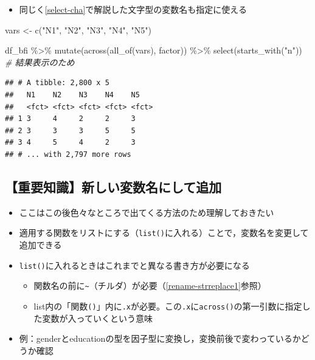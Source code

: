 \documentclass[
  xelatex,ja=standard, b5paper]{bxjsbook}
\newenvironment{Shaded}{\begin{snugshade}}{\end{snugshade}}
\newcommand{\CommentTok}[1]{\textcolor[rgb]{0.56,0.35,0.01}{\textit{#1}}}
\newcommand{\FunctionTok}[1]{\textcolor[rgb]{0.00,0.00,0.00}{#1}}
\newcommand{\NormalTok}[1]{#1}
\newcommand{\OtherTok}[1]{\textcolor[rgb]{0.56,0.35,0.01}{#1}}
\newcommand{\SpecialCharTok}[1]{\textcolor[rgb]{0.00,0.00,0.00}{#1}}
\newcommand{\StringTok}[1]{\textcolor[rgb]{0.31,0.60,0.02}{#1}}
\providecommand{\tightlist}{%
  \setlength{\itemsep}{0pt}\setlength{\parskip}{0pt}}
\begin{document}
\begin{itemize}
\tightlist
\item
  同じく\ref{select-cha}で解説した文字型の変数名も指定に使える
\end{itemize}

\begin{Shaded}
\begin{Highlighting}[]
\NormalTok{vars }\OtherTok{\textless{}{-}} \FunctionTok{c}\NormalTok{(}\StringTok{"N1"}\NormalTok{, }\StringTok{"N2"}\NormalTok{, }\StringTok{"N3"}\NormalTok{, }\StringTok{"N4"}\NormalTok{, }\StringTok{"N5"}\NormalTok{)}

\NormalTok{df\_bfi }\SpecialCharTok{\%\textgreater{}\%}
  \FunctionTok{mutate}\NormalTok{(}\FunctionTok{across}\NormalTok{(}\FunctionTok{all\_of}\NormalTok{(vars),}
\NormalTok{                factor)) }\SpecialCharTok{\%\textgreater{}\%} 
  \FunctionTok{select}\NormalTok{(}\FunctionTok{starts\_with}\NormalTok{(}\StringTok{"n"}\NormalTok{))   }\CommentTok{\# 結果表示のため}
\end{Highlighting}
\end{Shaded}

\begin{verbatim}
## # A tibble: 2,800 x 5
##   N1    N2    N3    N4    N5   
##   <fct> <fct> <fct> <fct> <fct>
## 1 3     4     2     2     3    
## 2 3     3     3     5     5    
## 3 4     5     4     2     3    
## # ... with 2,797 more rows
\end{verbatim}

\hypertarget{mu-across-list}{%
\subsection{【重要知識】新しい変数名にして追加}\label{mu-across-list}}

\begin{itemize}
\tightlist
\item
  ここはこの後色々なところで出てくる方法のため理解しておきたい
\item
  適用する関数をリストにする（\texttt{list()}に入れる）ことで，変数名を変更して追加できる
\item
  \texttt{list()}に入れるときはこれまでと異なる書き方が必要になる

  \begin{itemize}
  \tightlist
  \item
    関数名の前に\texttt{\textasciitilde{}}（チルダ）が必要（\ref{rename-strreplace1}参照）
  \item
    list内の「関数\texttt{()}」内に\texttt{.x}が必要。この\texttt{.x}に\texttt{across()}の第一引数に指定した変数が入っていくという意味
  \end{itemize}
\item
  例：genderとeducationの型を因子型に変換し，変換前後で変わっているかどうか確認
\end{itemize}
\end{document}
